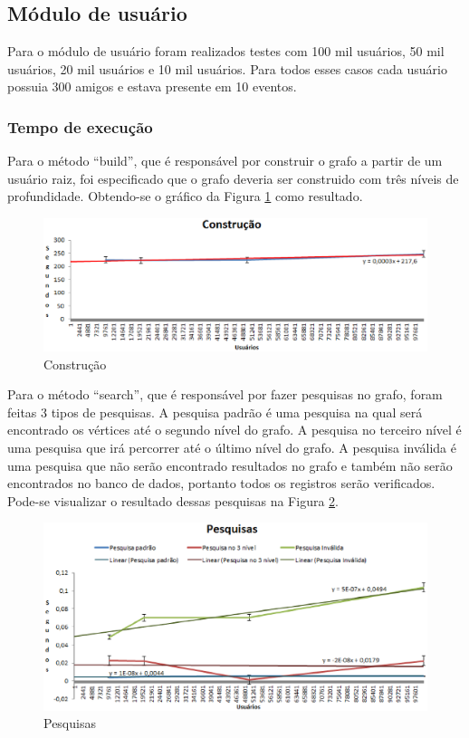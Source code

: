 \subsection{Módulo de usuário}

Para o módulo de usuário foram realizados testes com 100 mil usuários, 50 mil usuários, 20 mil usuários e 10 mil usuários. Para todos esses casos cada usuário possuia 300 amigos e estava presente em 10 eventos.

\subsubsection{Tempo de execução}

Para o método ``build'', que é responsável por construir o grafo a partir de um usuário raiz, foi especificado que o grafo deveria ser construido com três níveis de profundidade. Obtendo-se o gráfico da Figura \ref{build_tempo} como resultado.

\begin{figure}[!h]
	\centering
	\includegraphics[scale=0.8]{figuras/capitulo5/graficos/network/tempo/build.eps}
	\caption[Construção]{Construção}
	\label{build_tempo}
\end{figure}

Para o método ``search'', que é responsável por fazer pesquisas no grafo, foram feitas 3 tipos de pesquisas. A pesquisa padrão é uma pesquisa na qual será encontrado os vértices até o segundo nível do grafo. A pesquisa no terceiro nível é uma pesquisa que irá percorrer até o último nível do grafo. A pesquisa inválida é uma pesquisa que não serão encontrado resultados no grafo e também não serão encontrados no banco de dados, portanto todos os registros serão verificados. Pode-se visualizar o resultado dessas pesquisas na Figura \ref{search_tempo}.

\newpage

\begin{figure}[!h]
	\centering
	\includegraphics[scale=0.8]{figuras/capitulo5/graficos/network/tempo/pesquisas.eps}
	\caption[Pesquisas]{Pesquisas}
	\label{search_tempo}
\end{figure}

